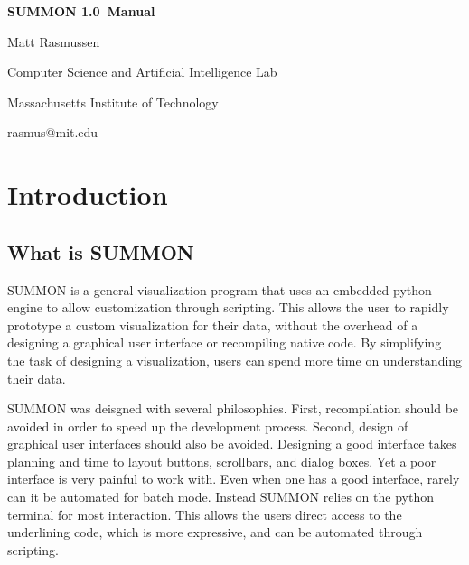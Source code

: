 \documentclass[12pt]{article}
\newcommand{\version}{1.0}
\begin{document}
\begin{titlepage}

\begin{center}

\vspace*{2.5in}

{\huge \bf {}\selectfont 
SUMMON \version\ Manual
}
\vspace*{.5in}

{\large
Matt Rasmussen
}
\vspace*{.5in}

Computer Science and Artificial Intelligence Lab

Massachusetts Institute of Technology

\vspace*{.25in}

rasmus@mit.edu
\end{center}

\end{titlepage}


\tableofcontents

\clearpage

\section{Introduction}
\label{sec:intro}


\subsection{What is SUMMON}

SUMMON is a general visualization program that uses an embedded python engine to
allow customization through scripting.  This allows the user to rapidly
prototype a custom visualization for their data, without the overhead of a
designing a graphical user interface or recompiling native code.  By simplifying
the task of designing a visualization, users can spend more time on
understanding their data. 

SUMMON was deisgned with several philosophies.  First, recompilation should
be avoided in order to speed up the development process.  Second, design of
graphical user interfaces should also be avoided.  Designing a good interface
takes planning and time to layout buttons, scrollbars, and dialog boxes.  Yet a 
poor interface is very painful to work with. Even when one has a good interface,
rarely can it be automated for batch mode.  Instead SUMMON relies on the
python terminal for most interaction.  This allows the users direct access to the
underlining code, which is more expressive, and can be automated through
scripting.  
\end{document}
